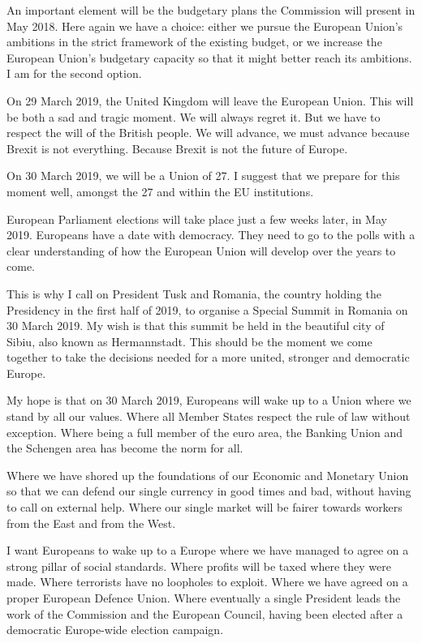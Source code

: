 \documentclass[a4paper,11pt]{article}
\begin{document}
An important element will be the budgetary plans the Commission will present in May 2018. Here again we have a choice: either we pursue the European Union's ambitions in the strict framework of the existing budget, or we increase the European Union's budgetary capacity so that it might better reach its ambitions. I am for the second option.

On 29 March 2019, the United Kingdom will leave the European Union. This will be both a sad and tragic moment. We will always regret it. But we have to respect the will of the British people. We will advance, we must advance because Brexit is not everything. Because Brexit is not the future of Europe.

On 30 March 2019, we will be a Union of 27. I suggest that we prepare for this moment well, amongst the 27 and within the EU institutions.

European Parliament elections will take place just a few weeks later, in May 2019. Europeans have a date with democracy. They need to go to the polls with a clear understanding of how the European Union will develop over the years to come.

This is why I call on President Tusk and Romania, the country holding the Presidency in the first half of 2019, to organise a Special Summit in Romania on 30 March 2019. My wish is that this summit be held in the beautiful city of Sibiu, also known as Hermannstadt. This should be the moment we come together to take the decisions needed for a more united, stronger and democratic Europe.

My hope is that on 30 March 2019, Europeans will wake up to a Union where we stand by all our values. Where all Member States respect the rule of law without exception. Where being a full member of the euro area, the Banking Union and the Schengen area has become the norm for all.

Where we have shored up the foundations of our Economic and Monetary Union so that we can defend our single currency in good times and bad, without having to call on external help. Where our single market will be fairer towards workers from the East and from the West.

I want Europeans to wake up to a Europe where we have managed to agree on a strong pillar of social standards. Where profits will be taxed where they were made. Where terrorists have no loopholes to exploit. Where we have agreed on a proper European Defence Union. Where eventually a single President leads the work of the Commission and the European Council, having been elected after a democratic Europe-wide election campaign.
\end{document}
